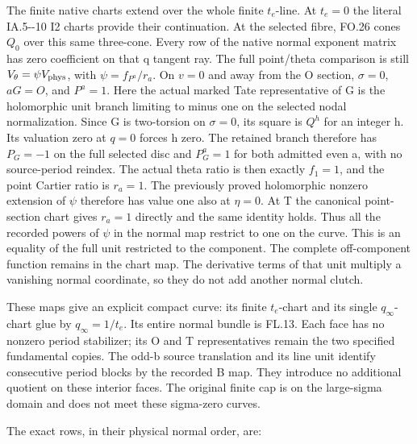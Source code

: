 The finite native charts extend over the whole finite
\(t_e\)-line. At \(t_e=0\) the literal IA.5-\/-10 I2 charts
provide their continuation. At the selected fibre, FO.26
cones \(Q_0\) over this same three-cone. Every row of the
native normal exponent matrix has zero coefficient on that
q tangent ray. The full point/theta comparison is still
\(V_\theta=\psi V_{\rm phys}\), with
\(\psi=f_{P^a}/r_a\). On \(v=0\) and away from the O
section, \(\sigma=0\), \(aG=O\), and \(P^a=1\).
Here the actual marked Tate representative of G is the
holomorphic unit branch limiting to minus one on the selected
nodal normalization. Since G is two-torsion on \(\sigma=0\),
its square is \(Q^h\) for an integer h. Its valuation zero
at \(q=0\) forces h zero. The retained branch therefore
has \(P_G=-1\) on the full selected disc and
\(P_G^a=1\) for both admitted even a, with no source-period
reindex. The actual theta ratio is then exactly \(f_1=1\), and
the point Cartier ratio is \(r_a=1\). The previously
proved holomorphic nonzero extension of \(\psi\) therefore
has value one also at \(\eta=0\). At T the canonical
point-section chart gives \(r_a=1\) directly and the same
identity holds. Thus all the recorded powers of \(\psi\)
in the normal map restrict to one on the curve. This is
an equality of the full unit restricted to the component.
The complete off-component function remains in the chart map.
The derivative terms of that unit multiply a vanishing
normal coordinate, so they do not add another normal clutch.

These maps give an explicit compact curve: its finite
\(t_e\)-chart and its single \(q_\infty\)-chart glue by
\(q_\infty=1/t_e\). Its entire normal bundle is FL.13.
Each face has no nonzero period stabilizer; its O and T
representatives remain the two specified fundamental
copies. The odd-b source translation and its line unit
identify consecutive period blocks by the recorded B map.
They introduce no additional quotient on these interior
faces. The original finite cap is on the large-sigma
domain and does not meet these sigma-zero curves.

The exact rows, in their physical normal order, are:

